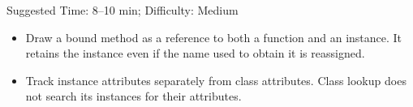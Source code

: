 \begin{parts}
\end{parts}

\begin{questionmeta}
Suggested Time: 8--10 min; Difficulty: Medium
\begin{itemize}
    \item Draw a bound method as a reference to both a function and an instance.
    It retains the instance even if the name used to obtain it is reassigned.
    \item Track instance attributes separately from class attributes. Class
    lookup does not search its instances for their attributes.
\end{itemize}
\end{questionmeta}
